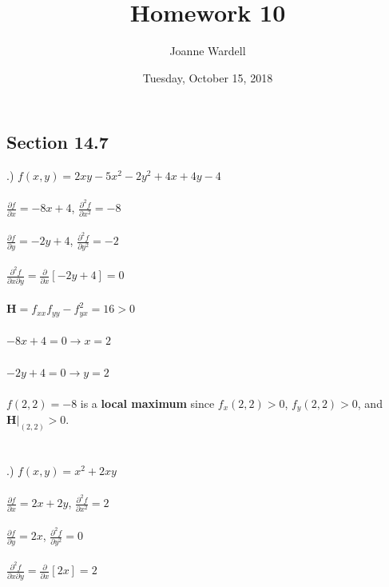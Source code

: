 \documentclass[12pt]{article}
\title{\vspace{-2.0cm}Homework 10}
\author{Joanne Wardell}
\date{Tuesday, October 15, 2018}
\begin{document}
\maketitle

\subsection*{Section 14.7}
.) $f(x,y) = 2xy-5x^{2}-2y^{2}+4x + 4y -4$\\\\
\noindent $\frac{\partial f}{\partial x} = -8x + 4$, \hspace{10pt} $\frac{\partial ^{2} f}{\partial x^{2}} = -8$\\\\
\noindent $\frac{\partial f}{\partial y} = -2y + 4$, \hspace{10pt} $\frac{\partial ^{2} f}{\partial y^{2}} = -2$\\\\
\noindent $\frac{\partial^{2} f}{\partial x \partial y } = \frac{\partial }{\partial x}[-2y + 4] = 0$\\\\
\noindent $\mathbf{H} = f_{xx}f_{yy} - f_{yx}^{2} = 16 > 0$\\\\
\noindent $-8x + 4 = 0 \rightarrow x = 2$\\\\
\noindent $-2y + 4 = 0 \rightarrow y = 2$\\\\
\noindent $f(2, 2) = -8$ is a \textbf{local maximum} since $f_{x}(2, 2) > 0$, $f_{y}(2, 2) > 0$, and $\mathbf{H}\Big|_{(2,2)} > 0$.\\\\\\
.) $f(x, y) = x^{2} + 2xy$\\\\
\noindent $\frac{\partial f}{\partial x} = 2x + 2y$, \hspace{10pt} $\frac{\partial ^{2} f}{\partial x^{2}} = 2$\\\\
\noindent $\frac{\partial f}{\partial y} = 2x$, \hspace{10pt} $\frac{\partial ^{2} f}{\partial y^{2}} = 0$\\\\
\noindent $\frac{\partial^{2} f}{\partial x \partial y } = \frac{\partial }{\partial x}[2x] = 2$\\\\
\end{document}
